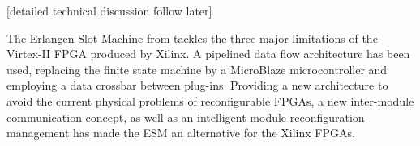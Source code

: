 
[detailed technical discussion follow later] 

The Erlangen Slot Machine from \cite{erlangen} tackles the three major limitations of the Virtex-II FPGA produced by Xilinx. A pipelined data flow architecture has been used, replacing the finite state machine by a MicroBlaze microcontroller and employing a data crossbar between plug-ins. Providing  a new architecture to avoid the current physical problems of reconfigurable FPGAs, a new inter-module communication concept, as well as an intelligent module reconfiguration management has made the ESM an alternative for the Xilinx FPGAs.
